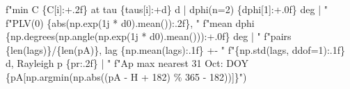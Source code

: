 \documentclass[
  10pt,
  a4paper,
]{article}
\newenvironment{Shaded}{}{}
\newcommand{\BuiltInTok}[1]{#1}
\newcommand{\DecValTok}[1]{#1}
\newcommand{\NormalTok}[1]{#1}
\newcommand{\OperatorTok}[1]{#1}
\newcommand{\OtherTok}[1]{#1}
\newcommand{\SpecialCharTok}[1]{#1}
\newcommand{\SpecialStringTok}[1]{#1}
\begin{document}
\begin{Shaded}
\begin{Highlighting}[]
          \SpecialStringTok{f"min C }\SpecialCharTok{\{}\NormalTok{C[i]}\SpecialCharTok{:+.2f\}}\SpecialStringTok{ at tau }\SpecialCharTok{\{}\NormalTok{taus[i]}\SpecialCharTok{:+d\}}\SpecialStringTok{ d | dphi(n=2) }\SpecialCharTok{\{}\NormalTok{dphi[}\DecValTok{1}\NormalTok{]}\SpecialCharTok{:+.0f\}}\SpecialStringTok{ deg | "}
          \SpecialStringTok{f"PLV(0) }\SpecialCharTok{\{}\BuiltInTok{abs}\NormalTok{(np.exp(}\OtherTok{1j} \OperatorTok{*}\NormalTok{ d0).mean())}\SpecialCharTok{:.2f\}}\SpecialStringTok{, "}
          \SpecialStringTok{f"mean dphi }\SpecialCharTok{\{}\NormalTok{np}\SpecialCharTok{.}\NormalTok{degrees(np.angle(np.exp(}\OtherTok{1j} \OperatorTok{*}\NormalTok{ d0).mean()))}\SpecialCharTok{:+.0f\}}\SpecialStringTok{ deg | "}
          \SpecialStringTok{f"pairs }\SpecialCharTok{\{}\BuiltInTok{len}\NormalTok{(lags)}\SpecialCharTok{\}}\SpecialStringTok{/}\SpecialCharTok{\{}\BuiltInTok{len}\NormalTok{(pA)}\SpecialCharTok{\}}\SpecialStringTok{, lag }\SpecialCharTok{\{}\NormalTok{np}\SpecialCharTok{.}\NormalTok{mean(lags)}\SpecialCharTok{:.1f\}}\SpecialStringTok{ +{-} "}
          \SpecialStringTok{f"}\SpecialCharTok{\{}\NormalTok{np}\SpecialCharTok{.}\NormalTok{std(lags, ddof}\OperatorTok{=}\DecValTok{1}\NormalTok{)}\SpecialCharTok{:.1f\}}\SpecialStringTok{ d, Rayleigh p }\SpecialCharTok{\{}\NormalTok{pr}\SpecialCharTok{:.2f\}}\SpecialStringTok{ | "}
          \SpecialStringTok{f"Ap max nearest 31 Oct: DOY }\SpecialCharTok{\{}\NormalTok{pA[np.argmin(np.}\BuiltInTok{abs}\NormalTok{((pA }\OperatorTok{{-}}\NormalTok{ H }\OperatorTok{+} \DecValTok{182}\NormalTok{) }\OperatorTok{\%} \DecValTok{365} \OperatorTok{{-}} \DecValTok{182}\NormalTok{))]}\SpecialCharTok{\}}\SpecialStringTok{"}\NormalTok{)}


\end{Highlighting}
\end{Shaded}
\end{document}
